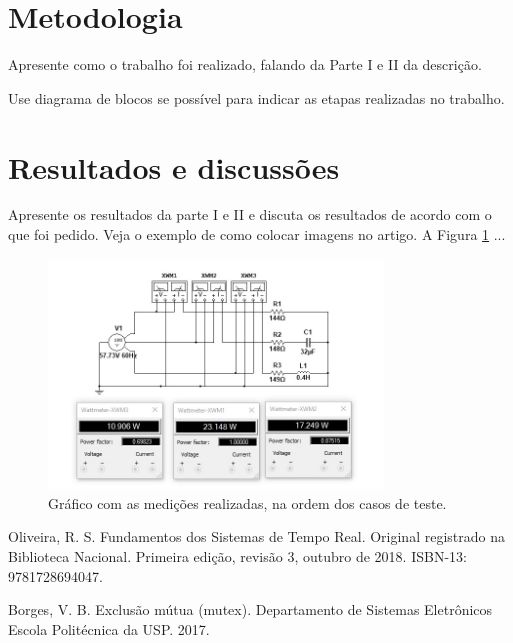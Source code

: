 \documentclass[journal]{IEEEtran}
\begin{document}
\section{Metodologia}

Apresente como o trabalho foi realizado, falando da Parte I e II da descrição. 

Use diagrama de blocos se possível para indicar as etapas realizadas no trabalho.

\section{Resultados e discussões}

Apresente os resultados da parte I e II e discuta os resultados de acordo com o que foi pedido. Veja o exemplo de como colocar imagens no artigo. A Figura \ref{fig1} ...

	\begin{figure}[h]
	\centering
	\includegraphics[width=3.5in]{Imagens/medidas.jpg}	
	\caption{Gráfico com as medições realizadas, na ordem dos casos de teste.}
	\label{fig1}
\end{figure}


\ifCLASSOPTIONcaptionsoff
  \newpage
\fi

\begin{thebibliography}{1}

Oliveira, R. S. Fundamentos dos Sistemas de Tempo Real. Original registrado na Biblioteca Nacional. Primeira edição, revisão 3, outubro de 2018. ISBN-13: 9781728694047.

Borges, V. B. Exclusão mútua (mutex). Departamento de Sistemas Eletrônicos Escola Politécnica da USP. 2017.

\end{thebibliography}

\end{document}
